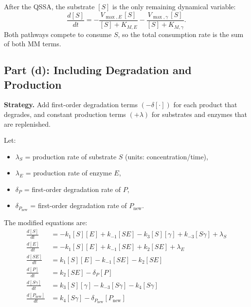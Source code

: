 \documentclass[12pt]{article}
\newcommand{\ddt}[1]{\frac{d[#1]}{dt}}
\newcommand{\KME}{K_{M,E}}
\newcommand{\KMg}{K_{M,\gamma}}
\begin{document}
After the QSSA, the substrate $[S]$ is the only remaining dynamical variable:
\begin{equation}
  \ddt{S} = -\frac{V_{\max,E}\,[S]}{[S]+\KME} - \frac{V_{\max,\gamma}\,[S]}{[S]+\KMg}.
  \label{eq:dS_QSSA}
\end{equation}
Both pathways compete to consume $S$, so the total consumption rate is the sum of both MM
terms.

\medskip

\subsection*{Part (d): Including Degradation and Production}

\begin{mdframed}[style=solutionbox]
\textbf{\color{solutiongreen}Strategy.}
Add first-order degradation terms $(-\delta[\cdot])$ for each product that degrades, and
constant production terms $(+\lambda)$ for substrates and enzymes that are replenished.
\end{mdframed}

Let:
\begin{itemize}[noitemsep]
  \item $\lambda_S$ = production rate of substrate $S$ (units: concentration/time),
  \item $\lambda_E$ = production rate of enzyme $E$,
  \item $\delta_P$ = first-order degradation rate of $P$,
  \item $\delta_{P_{\text{new}}}$ = first-order degradation rate of $P_{\text{new}}$.
\end{itemize}

The modified equations are:
\begin{align}
  \ddt{S}         &= -k_1[S][E] + k_{-1}[SE] - k_3[S][\gamma] + k_{-3}[S\gamma] + \lambda_S \\
  \ddt{E}         &= -k_1[S][E] + k_{-1}[SE] + k_2[SE] + \lambda_E \\
  \ddt{SE}        &= k_1[S][E] - k_{-1}[SE] - k_2[SE] \\
  \ddt{P}         &= k_2[SE] - \delta_P [P] \\
  \ddt{S\gamma}   &= k_3[S][\gamma] - k_{-3}[S\gamma] - k_4[S\gamma] \\
  \frac{d[P_{\text{new}}]}{dt} &= k_4[S\gamma] - \delta_{P_{\text{new}}}[P_{\text{new}}]
\end{align}
\end{document}
